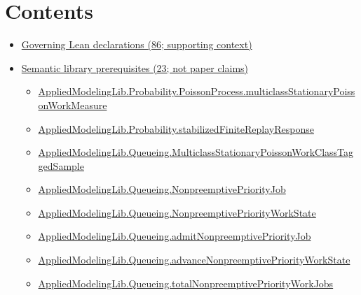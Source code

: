 \documentclass[10pt]{article}
\begin{document}
\section*{Contents}
\begin{itemize}[leftmargin=1.2em]
\item \hyperlink{governing-declaration-section-5ef5ef0364b6939c}{Governing Lean declarations (86; supporting context)}
\item \hyperlink{library-section-994978aceb8dd183}{Semantic library prerequisites (23; not paper claims)}
\begin{itemize}[leftmargin=1.2em]
\item \hyperlink{library-prerequisite-dba97dbb9d8c7c91}{Applied\allowbreak{}Modeling\allowbreak{}Lib.\allowbreak{}Probability.\allowbreak{}Poisson\allowbreak{}Process.\allowbreak{}multiclass\allowbreak{}Stationary\allowbreak{}Poisson\allowbreak{}Work\allowbreak{}Measure}
\item \hyperlink{library-prerequisite-4b8788f2f9337ce3}{Applied\allowbreak{}Modeling\allowbreak{}Lib.\allowbreak{}Probability.\allowbreak{}stabilized\allowbreak{}Finite\allowbreak{}Replay\allowbreak{}Response}
\item \hyperlink{library-prerequisite-755cdb28ceaf46d2}{Applied\allowbreak{}Modeling\allowbreak{}Lib.\allowbreak{}Queueing.\allowbreak{}Multiclass\allowbreak{}Stationary\allowbreak{}Poisson\allowbreak{}Work\allowbreak{}Class\allowbreak{}Tagged\allowbreak{}Sample}
\item \hyperlink{library-prerequisite-2373fe691c32d999}{Applied\allowbreak{}Modeling\allowbreak{}Lib.\allowbreak{}Queueing.\allowbreak{}Nonpreemptive\allowbreak{}Priority\allowbreak{}Job}
\item \hyperlink{library-prerequisite-e68cb5fce009ec53}{Applied\allowbreak{}Modeling\allowbreak{}Lib.\allowbreak{}Queueing.\allowbreak{}Nonpreemptive\allowbreak{}Priority\allowbreak{}Work\allowbreak{}State}
\item \hyperlink{library-prerequisite-837de7f0cc179814}{Applied\allowbreak{}Modeling\allowbreak{}Lib.\allowbreak{}Queueing.\allowbreak{}admit\allowbreak{}Nonpreemptive\allowbreak{}Priority\allowbreak{}Job}
\item \hyperlink{library-prerequisite-96200a424cf39dee}{Applied\allowbreak{}Modeling\allowbreak{}Lib.\allowbreak{}Queueing.\allowbreak{}advance\allowbreak{}Nonpreemptive\allowbreak{}Priority\allowbreak{}Work\allowbreak{}State}
\item \hyperlink{library-prerequisite-d49e277073e052d4}{Applied\allowbreak{}Modeling\allowbreak{}Lib.\allowbreak{}Queueing.\allowbreak{}total\allowbreak{}Nonpreemptive\allowbreak{}Priority\allowbreak{}Work\allowbreak{}Jobs}

\end{itemize}
\end{itemize}
\end{document}
